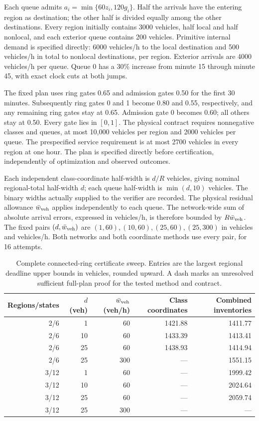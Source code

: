 \documentclass[preprint,12pt]{elsarticle}
\numberwithin{equation}{section}
\begin{document}
Each queue admits $a_i=\min\{60z_i,120g_i\}$. Half the arrivals have the
entering region as destination; the other half is divided equally among the
other destinations. Every region initially contains 3000 vehicles, half
local and half nonlocal, and each exterior queue contains 200 vehicles.
Primitive internal demand is specified directly: 6000 vehicles/h to the local
destination and 500 vehicles/h in total to nonlocal destinations, per region.
Exterior arrivals are 4000 vehicles/h per queue. Queue 0 has a 30\% increase
from minute 15 through minute 45, with exact clock cuts at both jumps.

The fixed plan uses ring gates 0.65 and admission gates 0.50 for the first
30 minutes. Subsequently ring gates 0 and 1 become 0.80 and 0.55, respectively,
and any remaining ring gates stay at 0.65. Admission gate 0 becomes 0.60;
all others stay at 0.50. Every gate lies in $[0,1]$. The physical contract
requires nonnegative classes and queues, at most 10,000 vehicles per region
and 2000 vehicles per queue. The prespecified service requirement is at most
2700 vehicles in every region at one hour. The plan is specified directly
before certification, independently of optimization and observed outcomes.

Each independent class-coordinate half-width is $d/R$ vehicles, giving nominal
regional-total half-width $d$; each queue half-width is $\min(d,10)$ vehicles.
The binary widths actually supplied to the verifier are recorded. The physical
residual allowance $\bar w_{\rm veh}$ applies independently to each queue.
The network-wide sum of absolute arrival errors, expressed in vehicles/h,
is therefore bounded by $R\bar w_{\rm veh}$. The fixed pairs
$(d,\bar w_{\rm veh})$ are $(1,60),(10,60),(25,60),(25,300)$ in vehicles and vehicles/h.
Both networks and both coordinate methods use every pair, for 16 attempts.
\begin{table}[t]
\centering\small
\caption{Complete connected-ring certificate sweep. Entries are the largest
regional deadline upper bounds in vehicles, rounded upward. A dash marks an
unresolved sufficient full-plan proof for the tested method and contract.}
\label{tab:network-transfer-complete}
\setlength{\tabcolsep}{4pt}
\begin{tabular}{@{}rrrrr@{}}
\toprule
Regions/states & $d$ (veh) & $\bar w_{\rm veh}$ (veh/h) & Class coordinates & Combined inventories\\
\midrule
2/6 & 1 & 60 & 1421.88 & 1411.77\\
2/6 & 10 & 60 & 1433.39 & 1413.41\\
2/6 & 25 & 60 & 1438.93 & 1414.94\\
2/6 & 25 & 300 & --- & 1551.15\\
3/12 & 1 & 60 & --- & 1999.42\\
3/12 & 10 & 60 & --- & 2024.64\\
3/12 & 25 & 60 & --- & 2059.74\\
3/12 & 25 & 300 & --- & ---\\
\bottomrule
\end{tabular}
\end{table}
\end{document}
